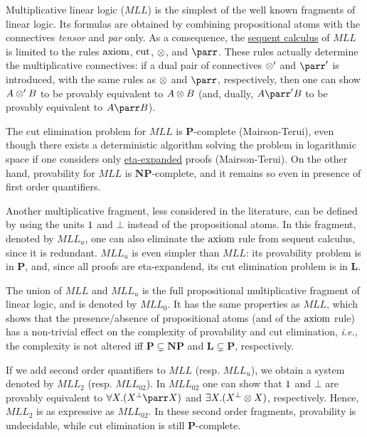 Multiplicative linear logic (\(MLL\)) is the simplest of the well known
fragments of linear logic. Its formulas are obtained by combining
propositional atoms with the connectives \emph{tensor} and \emph{par}
only. As a consequence, the
\href{Sequent_calculus\#Sequents_and_proofs}{sequent calculus} of
\(MLL\) is limited to the rules \(\operatorname{axiom}\),
\(\operatorname{cut}\), \(\otimes\), and \(\parr\). These rules actually
determine the multiplicative connectives: if a dual pair of connectives
\(\otimes'\) and \(\parr'\) is introduced, with the same rules as
\(\otimes\) and \(\parr\), respectively, then one can show \(A\otimes' B\)
to be provably equivalent to \(A\otimes B\) (and, dually, \(A\parr'B\) to
be provably equivalent to \(A\parr B\)).

The cut elimination problem for \(MLL\) is \(\mathbf P\)-complete
(Mairson-Terui), even though there exists a deterministic algorithm
solving the problem in logarithmic space if one considers only
\href{Sequent_calculus\#Expansion_of_identities}{eta-expanded} proofs
(Mairson-Terui). On the other hand, provability for \(MLL\) is
\(\mathbf{NP}\)-complete, and it remains so even in presence of first
order quantifiers.

Another multiplicative fragment, less considered in the literature, can
be defined by using the units \(1\) and \(\bot\) instead of the
propositional atoms. In this fragment, denoted by \(MLL_u\), one can
also eliminate the \(\operatorname{axiom}\) rule from sequent calculus,
since it is redundant. \(MLL_u\) is even simpler than \(MLL\): its
provability problem is in \(\mathbf P\), and, since all proofs are
eta-expandend, its cut elimination problem is in \(\mathbf L\).

The union of \(MLL\) and \(MLL_u\) is the full propositional
multiplicative fragment of linear logic, and is denoted by \(MLL_0\). It
has the same properties as \(MLL\), which shows that the
presence/absence of propositional atoms (and of the \(\operatorname{axiom}\)
rule) has a non-trivial effect on the complexity of provability and cut
elimination, \emph{i.e.}, the complexity is not altered iff
\(\mathbf P\subsetneq\mathbf{NP}\) and \(\mathbf L\subsetneq\mathbf P\),
respectively.

If we add second order quantifiers to \(MLL\) (resp. \(MLL_u\)), we
obtain a system denoted by \(MLL_2\) (resp. \(MLL_{02}\)). In
\(MLL_{02}\) one can show that \(1\) and \(\bot\) are provably
equivalent to \(\forall X.(X\orth\parr X)\) and
\(\exists X.(X^\bot\otimes X)\), respectively. Hence, \(MLL_2\) is as
expressive as \(MLL_{02}\). In these second order fragments, provability
is undecidable, while cut elimination is still \(\mathbf P\)-complete.

